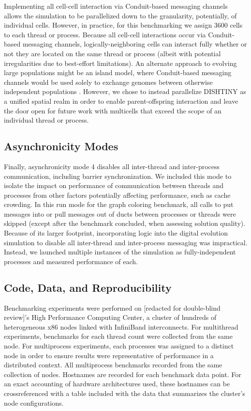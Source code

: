 Implementing all cell-cell interaction via Conduit-based messaging channels allows the simulation to be parallelized down to the granularity, potentially, of individual cells.
However, in practice, for this benchmarking we assign 3600 cells to each thread or process.
Because all cell-cell interactions occur via Conduit-based messaging channels, logically-neighboring cells can interact fully whether or not they are located on the same thread or process (albeit with potential irregularities due to best-effort limitations).
An alternate approach to evolving large populations might be an island model, where Conduit-based messaging channels would be used solely to exchange genomes between otherwise independent populations \cite{bennett1999building}.
However, we chose to instead parallelize DISHTINY as a unified spatial realm in order to enable parent-offspring interaction and leave the door open for future work with multicells that exceed the scope of an individual thread or process.

\subsection{Asynchronicity Modes} \label{sec:asynchronicity_modes}


Finally, asynchronicity mode 4 disables all inter-thread and inter-process communication, including barrier synchronization.
We included this mode to isolate the impact on performance of communication between threads and processes from other factors potentially affecting performance, such as cache crowding.
In this run mode for the graph coloring benchmark, all calls to put messages into or pull messages out of ducts between processes or threads were skipped (except after the benchmark concluded, when assessing solution quality).
Because of its larger footprint, incorporating logic into the digital evolution simulation to disable all inter-thread and inter-process messaging was impractical.
Instead, we launched multiple instances of the simulation as fully-independent processes and measured performance of each.

\subsection{Code, Data, and Reproducibility}

Benchmarking experiments were performed on [redacted for double-blind review]'s High Performance Computing Center, a cluster of hundreds of heterogeneous x86 nodes linked with InfiniBand interconnects.
For multithread experiments, benchmarks for each thread count were collected from the same node.
For multiprocess experiments, each processes was assigned to a distinct node in order to ensure results were representative of performance in a distributed context.
All multiprocess benchmarks recorded from the same collection of nodes.
Hostnames are recorded for each benchmark data point.
For an exact accounting of hardware architectures used, these hostnames can be crossreferenced with a table included with the data that summarizes the cluster's node configurations.


